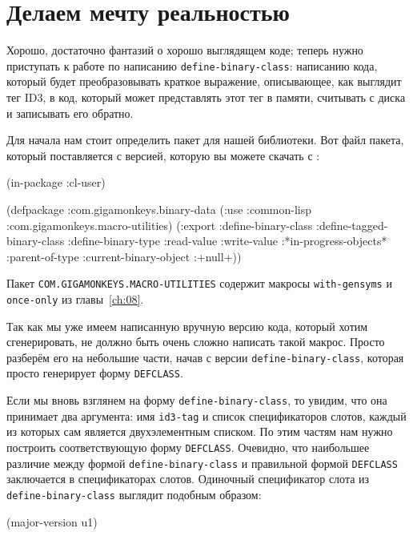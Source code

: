 \section{Делаем мечту реальностью}

Хорошо, достаточно фантазий о хорошо выглядящем коде; теперь нужно приступать к работе по
написанию \lstinline{define-binary-class}: написанию кода, который будет преобразовывать
краткое выражение, описывающее, как выглядит тег ID3, в код, который может представлять
этот тег в памяти, считывать с диска и записывать его обратно.

Для начала нам стоит определить пакет для нашей библиотеки. Вот файл пакета, который
поставляется с версией, которую вы можете скачать с
\hspace{-0.25em}:

\begin{myverb}
(in-package :cl-user)

(defpackage :com.gigamonkeys.binary-data
  (:use :common-lisp :com.gigamonkeys.macro-utilities)
  (:export :define-binary-class
           :define-tagged-binary-class
           :define-binary-type
           :read-value
           :write-value
           :*in-progress-objects*
           :parent-of-type
           :current-binary-object
           :+null+))
\end{myverb}

Пакет \lstinline{COM.GIGAMONKEYS.MACRO-UTILITIES} содержит макросы \lstinline{with-gensyms} и
\lstinline{once-only} из главы~\ref{ch:08}.

Так как мы уже имеем написанную вручную версию кода, который хотим сгенерировать, не
должно быть очень сложно написать такой макрос. Просто разберём его на небольшие части,
начав с версии \lstinline{define-binary-class}, которая просто генерирует форму
\lstinline{DEFCLASS}.

Если мы вновь взглянем на форму \lstinline{define-binary-class}, то увидим, что она принимает
два аргумента: имя \lstinline{id3-tag} и список спецификаторов слотов, каждый из которых сам
является двухэлементным списком. По этим частям нам нужно построить соответствующую форму
\lstinline{DEFCLASS}. Очевидно, что наибольшее различие между формой
\lstinline{define-binary-class} и правильной формой \lstinline{DEFCLASS} заключается в
спецификаторах слотов. Одиночный спецификатор слота из \lstinline{define-binary-class} выглядит
подобным образом:

\begin{myverb}
(major-version u1)
\end{myverb}

